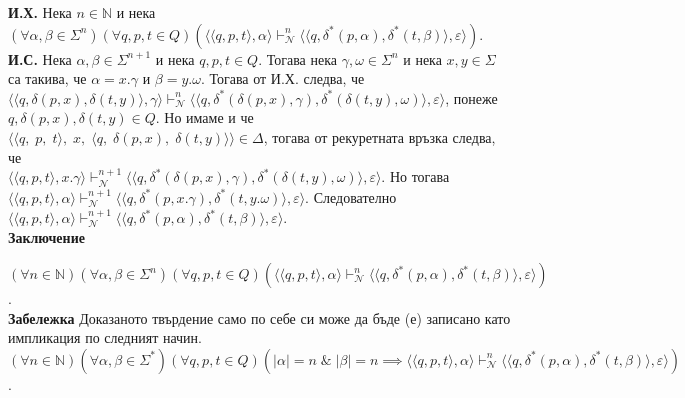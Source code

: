 \documentclass[12pt]{article}
\begin{document}
\textbf{И.Х.}
Нека \(n \in \mathbb N\) и нека \((\forall \alpha, \beta \in \Sigma^n)(\forall q, p, t \in Q)(\langle \langle q, p, t \rangle, \alpha \rangle \vdash_{\mathcal N}^n  \langle \langle q, \delta^*(p, \alpha), \delta^*(t, \beta) \rangle, \varepsilon \rangle )\). \\

\textbf{И.С.}
Нека  \(\alpha, \beta \in \Sigma^{n + 1}\) и нека \(q, p, t \in Q\).
Тогава нека \(\gamma, \omega \in \Sigma^n\) и нека \(x, y \in \Sigma\) са такива, че
\(\alpha = x.\gamma\) и \(\beta = y.\omega\). Тогава от И.Х. следва, че
\(\langle \langle q, \delta(p, x), \delta(t, y) \rangle, \gamma \rangle \vdash_{\mathcal N}^n  \langle \langle q, \delta^*(\delta(p, x), \gamma), \delta^*(\delta(t, y), \omega) \rangle, \varepsilon \rangle\),
понеже \(q, \delta(p, x), \delta(t, y) \in Q\). Но имаме и че
\(\langle \langle q,\; p,\; t \rangle,\; x,\; \langle q,\; \delta(p, x),\; \delta(t, y) \rangle \rangle \in \Delta\), тогава от рекуретната връзка следва, че \\
\(\langle \langle q, p, t \rangle, x.\gamma \rangle \vdash_{\mathcal N}^{n + 1}  \langle \langle q, \delta^*(\delta(p, x), \gamma), \delta^*(\delta(t, y), \omega) \rangle, \varepsilon \rangle\). Но тогава
\(\langle \langle q, p, t \rangle, \alpha \rangle \vdash_{\mathcal N}^{n + 1}  \langle \langle q, \delta^*(p, x.\gamma), \delta^*(t, y.\omega) \rangle, \varepsilon \rangle\).
Следователно
\(\langle \langle q, p, t \rangle, \alpha \rangle \vdash_{\mathcal N}^{n + 1}  \langle \langle q, \delta^*(p, \alpha), \delta^*(t, \beta) \rangle, \varepsilon \rangle\). \\

\textbf{Заключение}

\((\forall n \in \mathbb N)(\forall \alpha, \beta \in \Sigma^n)(\forall q, p, t \in Q)(\langle \langle q, p, t \rangle, \alpha \rangle \vdash_{\mathcal N}^n  \langle \langle q, \delta^*(p, \alpha), \delta^*(t, \beta) \rangle, \varepsilon \rangle )\). \\

\textbf{Забележка}
Доказаното твърдение само по себе си може да бъде (е) записано като импликация по следният начин. \\

\((\forall n \in \mathbb N)(\forall \alpha, \beta \in \Sigma^*)(\forall q, p, t \in Q)(|\alpha| = n \;\&\; |\beta| = n \implies \langle \langle q, p, t \rangle, \alpha \rangle \vdash_{\mathcal N}^n  \langle \langle q, \delta^*(p, \alpha), \delta^*(t, \beta) \rangle, \varepsilon \rangle )\). \\
\end{document}
